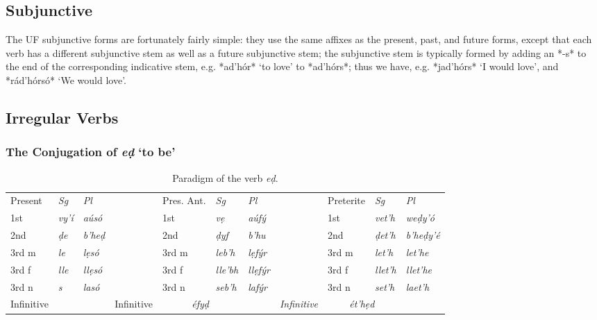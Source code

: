 \documentclass[a4paper, 12pt, oneside, final]{article}
\let \nf \normalfont
\begin{document}
\subsection{Subjunctive}
The UF subjunctive forms are fortunately fairly simple: they use the same affixes as the present, past, and future
forms, except that each verb has a different subjunctive stem as well as a future subjunctive stem; the subjunctive
stem is typically formed by adding an *-s* to the end of the corresponding indicative stem, e.g. *ad’hór*
‘to love’ to *ad’hórs*; thus we have, e.g. *jad’hórs* ‘I would love’, and *rád’hórsó* ‘We would love’.

\subsection{Irregular Verbs}\label{subsec:irregular-verbs}
\subsubsection{The Conjugation of \textit{eḍ} ‘to be’}


\begin{table}[H]
\centering
\noindent\begin{tabular}{@{}|>{}l|>{\it}l|>{\it}l|l|l|>{\it}l|>{\it}l|l|l|>{\it}l|>{\it}l|}\cline{1-3}\cline{5-7}\cline{9-11}
Present&\nf Sg&\nf Pl    && Pres. Ant.&\nf Sg&\nf Pl    && Preterite&\nf Sg&\nf Pl      \\\cline{1-3}\cline{5-7}\cline{9-11}
1st       & vy’í & aúsó   && 1st      & vẹ     & aúfý   && 1st       & vet’h & weḍy’ó   \\\cline{1-3}\cline{5-7}\cline{9-11}
2nd       & ḍe   & b’heḍ && 2nd       & ḍyf    & b’hu   && 2nd       & ḍet’h & b’heḍy’é \\\cline{1-3}\cline{5-7}\cline{9-11}
3rd m     & le   & lẹsó  && 3rd m     & leb’h  & lẹfýr  && 3rd m     & let’h & let’he   \\\cline{1-3}\cline{5-7}\cline{9-11}
3rd f     & lle  & llẹsó && 3rd f     & lle’bh & llẹfýr && 3rd f     & llet’h & llet’he \\\cline{1-3}\cline{5-7}\cline{9-11}
3rd n     & s    & lasó  && 3rd n     & seb’h  & lafýr  && 3rd n     & set’h & laet’h   \\\cline{1-3}\cline{5-7}\cline{9-11}
Infinitive& \multicolumn{2}{c|}{\it éḍ} && Infinitive& \multicolumn{2}{c|}{\it éfyḍ} && Infinitive& \multicolumn{2}{c|}{\it ét’hẹd} \\\cline{1-3}\cline{5-7}\cline{9-11}
\end{tabular}
\caption{Paradigm of the verb \emph{eḍ}.}\label{tab:ed-paradigm}
\end{table}
\end{document}
